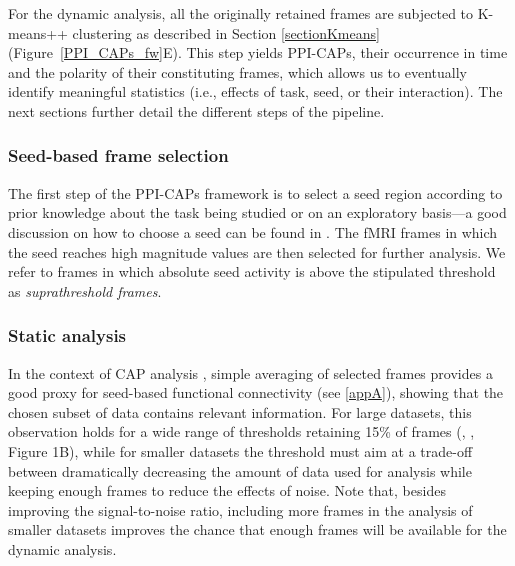 For the dynamic analysis, all the originally retained frames are subjected to K-means++ clustering  \citep{Arthur2007} as described in Section \ref{sectionKmeans} (Figure~\ref{PPI_CAPs_fw}E). This step yields PPI-CAPs, their occurrence in time and the polarity of their constituting frames, which allows us to eventually identify meaningful statistics (i.e., effects of task, seed, or their interaction). The next sections further detail the different steps of the pipeline.

\subsubsection{Seed-based frame selection}

The first step of the PPI-CAPs framework is to select a seed region according to prior knowledge about the task being studied or on an exploratory basis---a good discussion on how to choose a seed can be found in \citet{OReilly2012a}. The fMRI frames in which the seed reaches high magnitude values are then selected for further analysis. We refer to frames in which absolute seed activity is above the stipulated threshold as \textit{suprathreshold frames}.

\subsubsection{Static analysis} \label{met:static_analysis}
In the context of CAP analysis \citep{Tagliazucchi2012,Liu2013}, simple averaging of selected frames provides a good proxy for seed-based functional connectivity (see \ref{appA}), showing that the chosen subset of data contains relevant information. For large datasets, this observation holds for a wide range of thresholds retaining 15\% of frames (\citeauthor{Liu2013}, \citeyear{Liu2013}, Figure 1B), while for smaller datasets the threshold must aim at a trade-off between dramatically decreasing the amount of data used for analysis while keeping enough frames to reduce the effects of noise. Note that, besides improving the signal-to-noise ratio, including more frames in the analysis of smaller datasets improves the chance that enough frames will be available for the dynamic analysis. 

